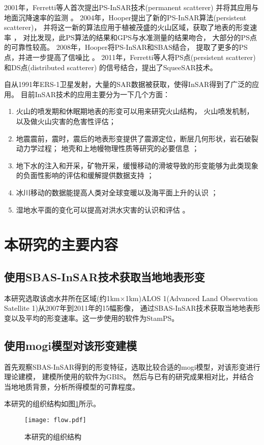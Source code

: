 2001年，Ferretti等人首次提出PS-InSAR技术(permanent scatterer)
\cite{ferrettiPermanentScatterersSAR2001}
并将其应用与地面沉降速率的监测
\cite{ferrettiNonlinearSubsidenceRate2000}。
2004年，Hooper提出了新的PS-InSAR算法(persistent scatterer)，
并将这一新的算法应用于植被茂盛的火山区域，获取了地表的形变速率
\cite{hooperNewMethodMeasuring2004}，
对比发现，此PS算法的结果和GPS与水准测量的结果吻合，
大部分的PS点的可靠性较高。
2008年，Hooper将PS-InSAR和SBAS结合，
提取了更多的PS点，并进一步提高了信噪比
\cite{hooperMultitemporalInSARMethod2008}。
2011年，Ferretti等人将PS点(persistent scatterer)和DS点(distributed scatterer)
的信号结合，提出了SqueeSAR技术。

自从1991年ERS-1卫星发射，大量的SAR数据被获取，使得InSAR得到了广泛的应用。
目前InSAR技术的应用主要分为一下几个方面：
\begin{enumerate}
  \item 火山的喷发期和休眠期地表的形变可以用来研究火山结构，
  火山喷发机制，以及做火山灾害的危害性评估\cite{luInSARImagingVolcanic2007}；
  \item 地震震前，震时，震后的地表形变提供了震源定位，断层几何形状，岩石破裂动力学过程；
  地壳和上地幔物理性质等研究的必要信息
  \cite{massonnetDisplacementFieldLanders1993,biggsMultiinterferogramMethodMeasuring2007}；
  \item 地下水的注入和开采，矿物开采，缓慢移动的滑坡导致的形变能够为此类现象的负面性影响的评估和缓解提供数据支持
  \cite{zhangMappingGroundSurface2012,zhaoLargeareaLandslideDetection2012}；
  \item 冰川移动的数据能提高人类对全球变暖以及海平面上升的认识
  \cite{rignotMassBalancePolar2002}；
  \item 湿地水平面的变化可以提高对洪水灾害的认识和评估
  \cite{luRadarsat1ERSInSAR2008}。
\end{enumerate}

\section{本研究的主要内容}

\subsection{使用SBAS-InSAR技术获取当地地表形变}
本研究选取该卤水井所在区域(约1km×1km)ALOS 1(Advanced Land Observation Satellite 1)从2007年到2011年的15幅影像，
通过SBAS-InSAR技术获取当地地表形变以及平均的形变速率。这一步使用的软件为StamPS。


\subsection{使用mogi模型对该形变建模}
首先观察SBAS-InSAR得到的形变特征，选取比较合适的mogi模型，对该形变进行理论建模，
建模所使用的软件为GBIS。
然后与已有的研究成果相对比，并结合当地地质背景，分析所得模型的可靠程度。

本研究的组织结构如图\ref{fig:flow}所示。
\begin{figure}[htb]
  \centering
  \texttt{[image: flow.pdf]}
  \caption{本研究的组织结构}
  \label{fig:flow}
\end{figure}